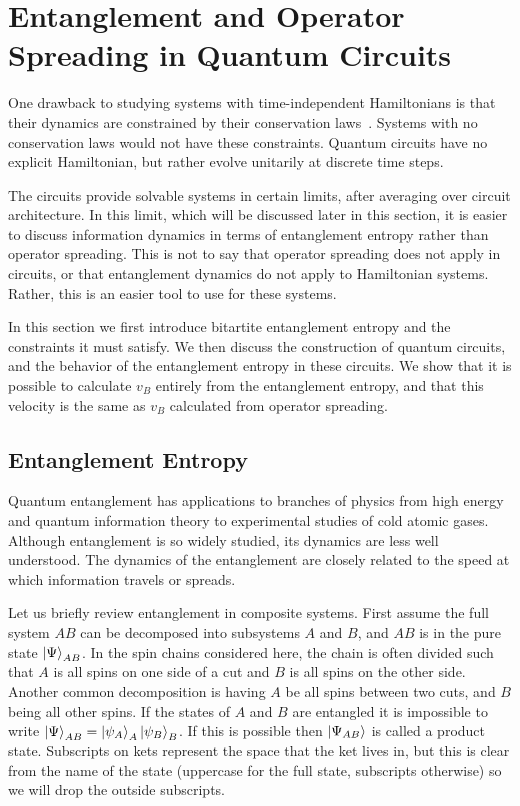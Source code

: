 \section{Entanglement and Operator Spreading in Quantum Circuits} \label{sec:circuits}

One drawback to studying systems with time-independent Hamiltonians is that their dynamics are constrained by their conservation laws~\cite{Jonay18}. Systems with no conservation laws would not have these constraints. Quantum circuits have no explicit Hamiltonian, but rather evolve unitarily at discrete time steps. 

The circuits provide solvable systems in certain limits, after averaging over circuit architecture. In this limit, which will be discussed later in this section, it is easier to discuss information dynamics in terms of entanglement entropy rather than operator spreading. This is not to say that operator spreading does not apply in circuits, or that entanglement dynamics do not apply to Hamiltonian systems. Rather, this is an easier tool to use for these systems.

In this section we first introduce bitartite entanglement entropy and the constraints it must satisfy. We then discuss the construction of quantum circuits, and the behavior of the entanglement entropy in these circuits. We show that it is possible to calculate $v_B$ entirely from the entanglement entropy, and that this velocity is the same as $v_B$ calculated from operator spreading.

\subsection{Entanglement Entropy} \label{sub:intro}

Quantum entanglement has applications to branches of physics from high energy and quantum information theory to experimental studies of cold atomic gases. Although entanglement is so widely studied, its dynamics are less well understood. The dynamics of the entanglement are closely related to the speed at which information travels or spreads. 

Let us briefly review entanglement in composite systems. First assume the full system $AB$ can be decomposed into subsystems $A$ and $B$, and $AB$ is in the pure state $\left|\Psi\right\rangle_{{AB}}$. In the spin chains considered here, the chain is often divided such that $A$ is all spins on one side of a cut and $B$ is all spins on the other side. Another common decomposition is having $A$ be all spins between two cuts, and $B$ being all other spins. If the states of $A$ and $B$ are entangled it is impossible to write $\left|\Psi\right\rangle_{AB} = \left|\psi_A\right\rangle_A \left|\psi_B\right\rangle_B$. If this is possible then $\left|\Psi_{{AB}}\right\rangle$ is called a product state. Subscripts on kets represent the space that the ket lives in, but this is clear from the name of the state (uppercase for the full state, subscripts otherwise) so we will drop the outside subscripts.

